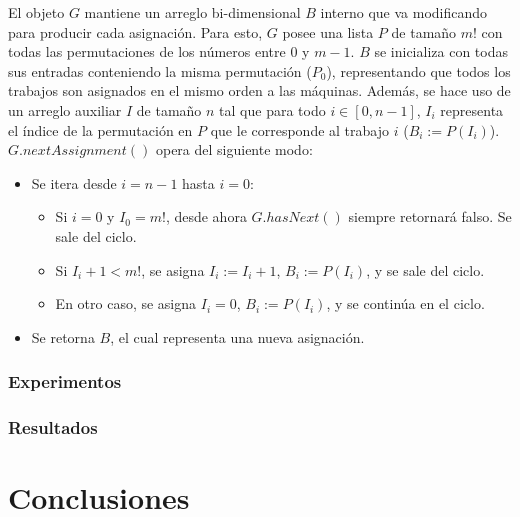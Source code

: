 \documentclass[12pt,letterpaper]{article}
\begin{document}
	 El objeto $G$ mantiene un arreglo bi-dimensional $B$ interno que va modificando para producir cada asignación. Para esto, $G$ posee una lista $P$ de tamaño $m!$ con todas las permutaciones de los números entre $0$ y $m-1$. $B$ se inicializa con todas sus entradas conteniendo la misma permutación ($P_{0}$), representando que todos los trabajos son asignados en el mismo orden a las máquinas. Además, se hace uso de un arreglo auxiliar $I$ de tamaño $n$ tal que para todo $i \in [0,n-1]$, $I_{i}$ representa el índice de la permutación en $P$ que le corresponde al trabajo $i$ ($B_{i} := P(I_{i})$). \\
	 
$G.nextAssignment()$ opera del siguiente modo:

\begin{itemize}
\item Se itera desde $i = n-1$ hasta $i = 0$:
	\begin{itemize}
	\item Si $i = 0$ y $I_{0} = m!$, desde ahora $G.hasNext()$ siempre retornará falso. Se sale del ciclo.
	\item Si $I_{i} + 1 < m!$, se asigna $I_{i} := I_{i} + 1$, $B_{i} := P(I_{i})$, y se sale del ciclo.
	\item En otro caso, se asigna $I_{i} = 0$, $B_{i} := P(I_{i})$, y se continúa en el ciclo.
	\end{itemize}
\item Se retorna $B$, el cual representa una nueva asignación.
\end{itemize}

\subsubsection{Experimentos}

\subsubsection{Resultados}

\section{Conclusiones}

\end{document}
